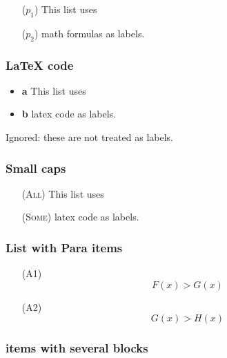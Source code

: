 \documentclass[
]{article}
\providecommand{\tightlist}{%
  \setlength{\itemsep}{0pt}\setlength{\parskip}{0pt}}
\begin{document}
\begin{itemize}
\tightlist

\item[(\(p_1\))] This list uses

\item[(\(p_2\))] math formulas as labels.

\end{itemize}

\hypertarget{latex-code}{%
\subsubsection{LaTeX code}\label{latex-code}}

\begin{itemize}
\tightlist
\item
  {\textbf{a}} This list uses
\item
  {\textbf{b}} latex code as labels.
\end{itemize}

Ignored: these are not treated as labels.

\hypertarget{small-caps}{%
\subsubsection{Small caps}\label{small-caps}}

\begin{itemize}
\tightlist

\item[(\textsc{All})] This list uses

\item[(\textsc{Some})] latex code as labels.

\end{itemize}

\hypertarget{list-with-para-items}{%
\subsubsection{List with Para items}\label{list-with-para-items}}

\begin{itemize}
\tightlist

\item[(A1)] \[F(x) > G(x)\]

\item[(A2)] \[G(x) > H(x)\]

\end{itemize}

\hypertarget{items-with-several-blocks}{%
\subsubsection{items with several
blocks}\label{items-with-several-blocks}}
\end{document}

